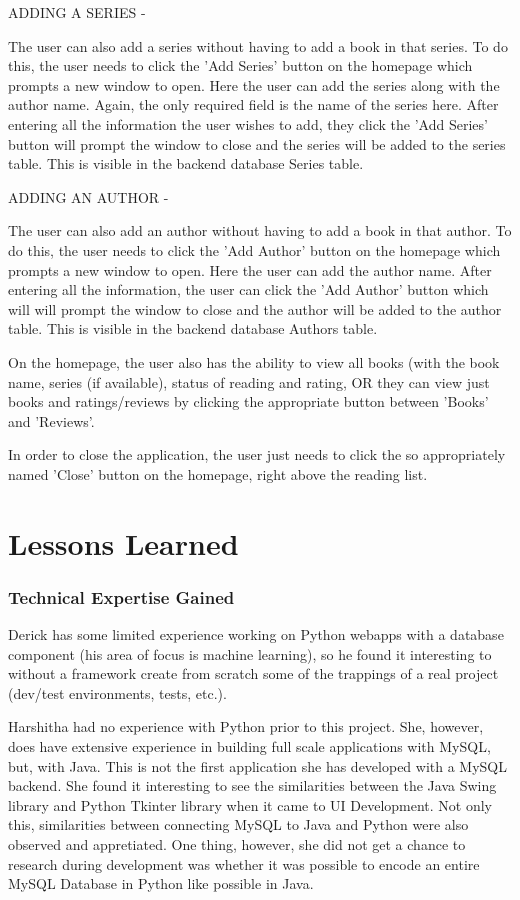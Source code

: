 \documentclass{article}
\begin{document}
ADDING A SERIES - 

The user can also add a series without having to add a book in that series. To do this, the user needs to 
click the 'Add Series' button on the homepage which prompts a new window to open. Here the user can add the 
series along with the author name. Again, the only required field is the name of the series here. After 
entering all the information the user wishes to add, they click the 'Add Series' button will prompt the 
window to close and the series will be added to the series table. This is visible in the backend database 
Series table.

ADDING AN AUTHOR - 

The user can also add an author without having to add a book in that author. To do this, the user needs to 
click the 'Add Author' button on the homepage which prompts a new window to open. Here the user can add the 
author name. After entering all the information, the user can click the 'Add Author' button which will will 
prompt the window to close and the author will be added to the author table. This is visible in the backend 
database Authors table.

On the homepage, the user also has the ability to view all books (with the book name, series (if available), 
status of reading and rating, OR they can view just books and ratings/reviews by clicking the appropriate 
button between 'Books' and 'Reviews'.

In order to close the application, the user just needs to click the so appropriately named 'Close' button on the 
homepage, right above the reading list. 

\section*{Lessons Learned}

\subsubsection*{Technical Expertise Gained}

Derick has some limited experience
working on Python webapps with a database component
(his area of focus is machine learning),
so he found it interesting to without a framework create from scratch
some of the trappings of a real project
(dev/test environments, tests, etc.).

Harshitha had no experience with Python prior to this project. She, however, does have extensive experience 
in building full scale applications with MySQL, but, with Java. This is not the first application she has 
developed with a MySQL backend. She found it interesting to see the similarities between the Java Swing 
library and Python Tkinter library when it came to UI Development. Not only this, similarities between 
connecting MySQL to Java and Python were also observed and appretiated. One thing, however, she did not get 
a chance to research during development was whether it was possible to encode an entire MySQL Database in 
Python like possible in Java.
\end{document}
